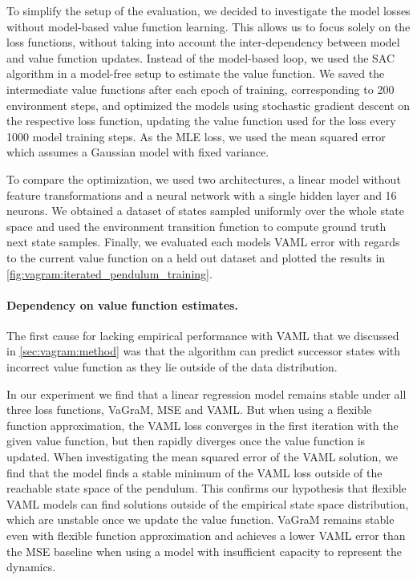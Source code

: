 To simplify the setup of the evaluation, we decided to investigate the model losses without model-based value function learning.
This allows us to focus solely on the loss functions, without taking into account the inter-dependency between model and value function updates.
Instead of the model-based loop, we used the SAC algorithm in a model-free setup to estimate the value function.
We saved the intermediate value functions after each epoch of training, corresponding to 200 environment steps, and optimized the models using stochastic gradient descent on the respective loss function, updating the value function used for the loss every 1000 model training steps.
As the MLE loss, we used the mean squared error which assumes a Gaussian model with fixed variance.

To compare the optimization, we used two architectures, a linear model without feature transformations and a neural network with a single hidden layer and 16 neurons.
We obtained a dataset of states sampled uniformly over the whole state space and used the environment transition function to compute ground truth next state samples.
Finally, we evaluated each models VAML error with regards to the current value function on a held out dataset and plotted the results in \autoref{fig:vagram:iterated_pendulum_training}.

\paragraph{Dependency on value function estimates.}
The first cause for lacking empirical performance with VAML that we discussed in \autoref{sec:vagram:method} was that the algorithm can predict successor states with incorrect value function as they lie outside of the data distribution.

In our experiment we find that a linear regression model remains stable under all three loss functions, VaGraM, MSE and VAML.
But when using a flexible function approximation, the VAML loss converges in the first iteration with the given value function, but then rapidly diverges once the value function is updated.
When investigating the mean squared error of the VAML solution, we find that the model finds a stable minimum of the VAML loss outside of the reachable state space of the pendulum.
This confirms our hypothesis that flexible VAML models can find solutions outside of the empirical state space distribution, which are unstable once we update the value function.
VaGraM remains stable even with flexible function approximation and achieves a lower VAML error than the MSE baseline when using a model with insufficient capacity to represent the dynamics.

